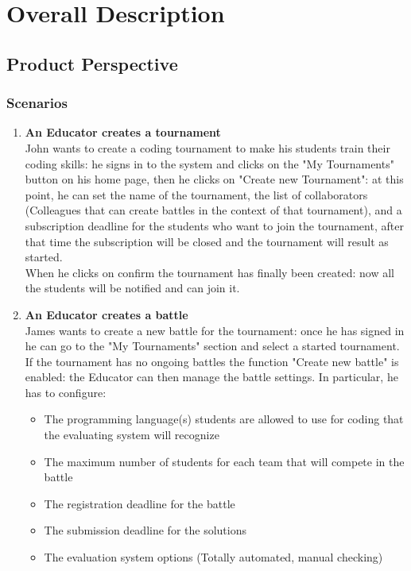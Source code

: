 \documentclass{article}
\begin{document}
\newpage

\section{Overall Description}
\subsection{Product Perspective}
\subsubsection{Scenarios}
\begin{enumerate}
  \item \textbf{An Educator creates a tournament\\}John wants to create a coding tournament to make his students train their
  coding skills: he signs in to the system and clicks on the "My Tournaments" button on his home page, then he clicks on "Create new Tournament":
  at this point, he can set the name of the tournament, the list of collaborators (Colleagues that can create battles in the context of that tournament), and a subscription
  deadline for the students who want to join the tournament, after that time the subscription will be closed and the tournament will result as started.\\
  When he clicks on confirm the tournament has finally been created: now all the students will be notified and can join it.\\
  \item \textbf{An Educator creates a battle\\}James wants to create a new battle for the tournament: once he has signed in he can go to the "My Tournaments" section
  and select a started tournament.\\
  If the tournament has no ongoing battles the function "Create new battle" is enabled: the Educator can then manage the battle settings.
  In particular, he has to configure:
  \begin{itemize}
    \item The programming language(s) students are allowed to use for coding that the evaluating system will recognize
    \item The maximum number of students for each team that will compete in the battle
    \item The registration deadline for the battle
    \item The submission deadline for the solutions
    \item The evaluation system options (Totally automated, manual checking)

\end{itemize}
\end{enumerate}
\end{document}
